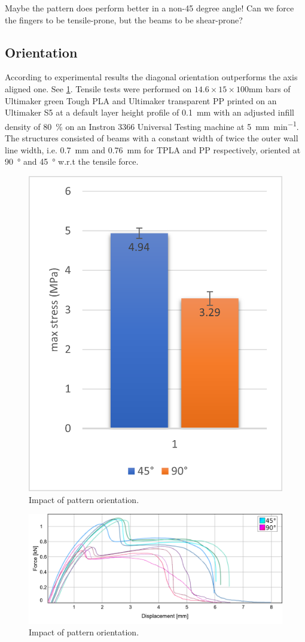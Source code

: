 Maybe the pattern does perform better in a non-45 degree angle!
Can we force the fingers to be tensile-prone, but the beams to be shear-prone?











\subsection{Orientation}
According to experimental results the diagonal orientation outperforms the axis aligned one.
See \cref{graph:45vs90}.
Tensile tests were performed on $14.6\times15\times100$\si{\milli\meter} bars of Ultimaker green Tough PLA and Ultimaker transparent PP
printed on an Ultimaker S5 at a default layer height profile of \SI{0.1}{\milli\meter} with an adjusted infill density of \SI{80}{\percent}
on an Instron 3366 Universal Testing machine at \SI{5}{\milli\meter\per\minute}.
The structures consisted of beams with a constant width of twice the outer wall line width, i.e. \SI{0.7}{\milli\meter} and \SI{0.76}{\milli\meter} for TPLA and PP respectively,
oriented at \SI{90}{\degree} and \SI{45}{\degree} w.r.t the tensile force.

\begin{figure}
	\centering
	\includegraphics[width=.5\columnwidth]{sources/testing/45vs90.png}
	\caption{Impact of pattern orientation.}
	\label{graph:45vs90}
\end{figure}


\begin{figure}
	\centering
	\includegraphics[width=\columnwidth]{sources/testing/45vs90_stress_strain.png}
	\caption{Impact of pattern orientation.}
	\label{graph:45vs90_stress_strain}
\end{figure}
